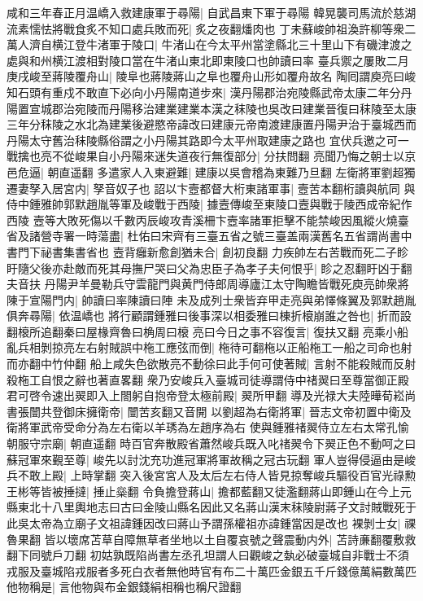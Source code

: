 咸和三年春正月温嶠入救建康軍于尋陽|{
	自武昌東下軍于尋陽}
韓晃襲司馬流於慈湖流素懦怯將戰食炙不知口處兵敗而死|{
	炙之夜翻燔肉也}
丁未蘇峻帥祖渙許柳等衆二萬人濟自横江登牛渚軍于陵口|{
	牛渚山在今太平州當塗縣北三十里山下有磯津渡之處與和州横江渡相對陵口當在牛渚山東北即東陵口也帥讀曰率}
臺兵禦之屢敗二月庚戌峻至蔣陵覆舟山|{
	陵阜也蔣陵蔣山之阜也覆舟山形如覆舟故名}
陶囘謂庾亮曰峻知石頭有重戍不敢直下必向小丹陽南道步來|{
	漢丹陽郡治宛陵縣武帝太康二年分丹陽置宣城郡治宛陵而丹陽移治建業建業本漢之秣陵也吳改曰建業晉復曰秣陵至太康三年分秣陵之水北為建業後避愍帝諱改曰建康元帝南渡建康置丹陽尹治于臺城西而丹陽太守舊治秣陵縣俗謂之小丹陽其路即今太平州取建康之路也}
宜伏兵邀之可一戰擒也亮不從峻果自小丹陽來迷失道夜行無復部分|{
	分扶問翻}
亮聞乃悔之朝士以京邑危逼|{
	朝直遥翻}
多遣家人入東避難|{
	建康以吳會稽為東難乃旦翻}
左衛將軍劉超獨遷妻孥入居宮内|{
	孥音奴子也}
詔以卞壼都督大桁東諸軍事|{
	壼苦本翻桁讀與航同}
與侍中鍾雅帥郭默趙胤等軍及峻戰于西陵|{
	據壼傳峻至東陵口壼與戰于陵西成帝紀作西陵}
壼等大敗死傷以千數丙辰峻攻青溪柵卞壼率諸軍拒擊不能禁峻因風縱火燒臺省及諸營寺署一時蕩盡|{
	杜佑曰宋齊有三臺五省之號三臺盖兩漢舊名五省謂尚書中書門下祕書集書省也}
壼背癰新愈創猶未合|{
	創初良翻}
力疾帥左右苦戰而死二子眕盱隨父後亦赴敵而死其母撫尸哭曰父為忠臣子為孝子夫何恨乎|{
	眕之忍翻盱凶于翻夫音扶}
丹陽尹羊曼勒兵守雲龍門與黄門侍郎周導廬江太守陶瞻皆戰死庾亮帥衆將陳于宣陽門内|{
	帥讀曰率陳讀曰陣}
未及成列士衆皆弃甲走亮與弟懌條翼及郭默趙胤俱奔尋陽|{
	依温嶠也}
將行顧謂鍾雅曰後事深以相委雅曰棟折榱崩誰之咎也|{
	折而設翻榱所追翻秦曰屋椽齊魯曰桷周曰榱}
亮曰今日之事不容復言|{
	復扶又翻}
亮乘小船亂兵相剝掠亮左右射賊誤中柂工應弦而倒|{
	柂待可翻柂以正船柂工一船之司命也射而亦翻中竹仲翻}
船上咸失色欲散亮不動徐曰此手何可使著賊|{
	言射不能殺賊而反射殺柂工自恨之辭也著直畧翻}
衆乃安峻兵入臺城司徒導謂侍中禇翜曰至尊當御正殿君可啓令速出翜即入上閤躬自抱帝登太極前殿|{
	翜所甲翻}
導及光禄大夫陸曄荀崧尚書張闓共登御床擁衛帝|{
	闓苦亥翻又音開}
以劉超為右衛將軍|{
	晉志文帝初置中衛及衛將軍武帝受命分為左右衛以羊琇為左趙序為右}
使與鍾雅禇翜侍立左右太常孔愉朝服守宗廟|{
	朝直遥翻}
時百官奔散殿省蕭然峻兵既入叱禇翜令下翜正色不動呵之曰蘇冠軍來覲至尊|{
	峻先以討沈充功進冠軍將軍故稱之冠古玩翻}
軍人豈得侵逼由是峻兵不敢上殿|{
	上時掌翻}
突入後宮宮人及太后左右侍人皆見掠奪峻兵驅役百官光祿勲王彬等皆被捶撻|{
	捶止橤翻}
令負擔登蔣山|{
	擔都藍翻又徒濫翻蔣山即鍾山在今上元縣東北十八里輿地志曰古曰金陵山縣名因此又名蔣山漢末秣陵尉蔣子文討賊戰死于此吳太帝為立廟子文祖諱鍾因改曰蔣山予謂孫權祖亦諱鍾當因是改也}
裸剝士女|{
	祼魯果翻}
皆以壞席苫草自障無草者坐地以土自覆哀號之聲震動内外|{
	苫詩亷翻覆敷救翻下同號戶刀翻}
初姑孰既陷尚書左丞孔坦謂人曰觀峻之埶必破臺城自非戰士不須戎服及臺城陷戎服者多死白衣者無他時官有布二十萬匹金銀五千斤錢億萬絹數萬匹他物稱是|{
	言他物與布金銀錢絹相稱也稱尺證翻}
